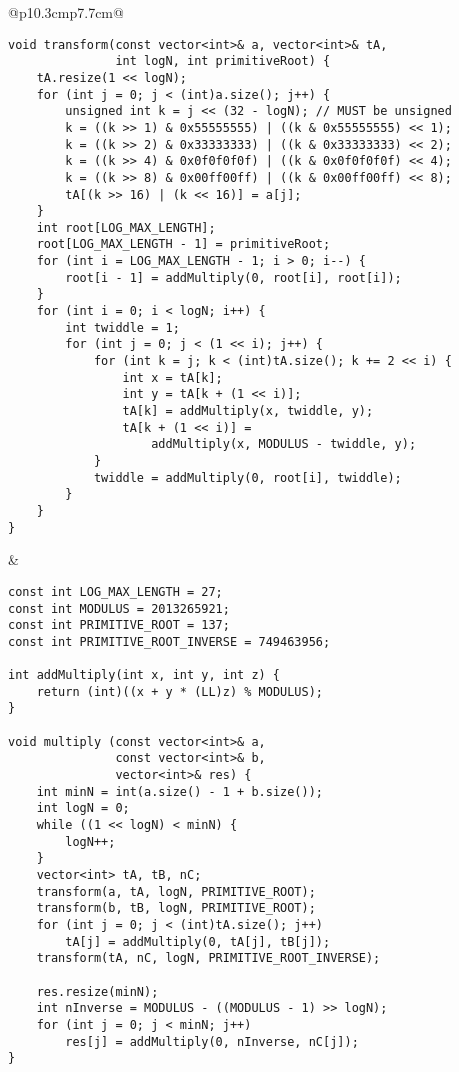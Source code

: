 \documentclass[letterpaper]{article}
\begin{document}
\begin{tabular}{@{}p{10.3cm}p{7.7cm}@{}}
    \begin{lstlisting}
void transform(const vector<int>& a, vector<int>& tA,
               int logN, int primitiveRoot) {
	tA.resize(1 << logN);
	for (int j = 0; j < (int)a.size(); j++) {
		unsigned int k = j << (32 - logN); // MUST be unsigned
		k = ((k >> 1) & 0x55555555) | ((k & 0x55555555) << 1);
		k = ((k >> 2) & 0x33333333) | ((k & 0x33333333) << 2);
		k = ((k >> 4) & 0x0f0f0f0f) | ((k & 0x0f0f0f0f) << 4);
		k = ((k >> 8) & 0x00ff00ff) | ((k & 0x00ff00ff) << 8);
		tA[(k >> 16) | (k << 16)] = a[j];
	}
	int root[LOG_MAX_LENGTH];
	root[LOG_MAX_LENGTH - 1] = primitiveRoot;
	for (int i = LOG_MAX_LENGTH - 1; i > 0; i--) {
		root[i - 1] = addMultiply(0, root[i], root[i]);
	}
	for (int i = 0; i < logN; i++) {
		int twiddle = 1;
		for (int j = 0; j < (1 << i); j++) {
			for (int k = j; k < (int)tA.size(); k += 2 << i) {
				int x = tA[k];
				int y = tA[k + (1 << i)];
				tA[k] = addMultiply(x, twiddle, y);
				tA[k + (1 << i)] =
					addMultiply(x, MODULUS - twiddle, y);
			}
			twiddle = addMultiply(0, root[i], twiddle);
		}
	}
}
\end{lstlisting}
     &
    \begin{lstlisting}
const int LOG_MAX_LENGTH = 27;
const int MODULUS = 2013265921;
const int PRIMITIVE_ROOT = 137;
const int PRIMITIVE_ROOT_INVERSE = 749463956;

int addMultiply(int x, int y, int z) {
	return (int)((x + y * (LL)z) % MODULUS);
}

void multiply (const vector<int>& a,
               const vector<int>& b,
               vector<int>& res) {
	int minN = int(a.size() - 1 + b.size());
	int logN = 0;
	while ((1 << logN) < minN) {
		logN++;
	}
	vector<int> tA, tB, nC;
	transform(a, tA, logN, PRIMITIVE_ROOT);
	transform(b, tB, logN, PRIMITIVE_ROOT);
	for (int j = 0; j < (int)tA.size(); j++)
		tA[j] = addMultiply(0, tA[j], tB[j]);
	transform(tA, nC, logN, PRIMITIVE_ROOT_INVERSE);

	res.resize(minN);
	int nInverse = MODULUS - ((MODULUS - 1) >> logN);
	for (int j = 0; j < minN; j++)
		res[j] = addMultiply(0, nInverse, nC[j]);
}
\end{lstlisting}
\end{tabular}
\end{document}
